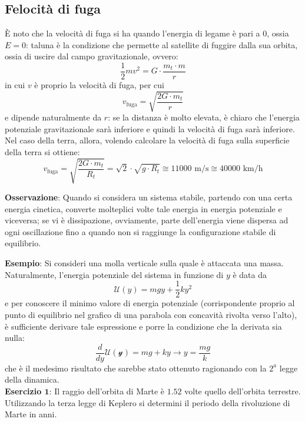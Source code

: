 \documentclass[a4paper]{extarticle}
\begin{document}
\vspace{1em}
\subsection{Felocità di fuga}
È noto che la velocità di fuga si ha quando l'energia di legame è pari a $0$, ossia $E=0$: taluna è la condizione che permette al satellite di fuggire dalla sua orbita, ossia di uscire dal campo gravitazionale, ovvero:
\[\frac{1}{2}m v^2 = G \cdot \frac{m_t \cdot m}{r}\]
in cui $v$ è proprio la velocità di fuga, per cui
\[\boxed{v_{\text{fuga}} = \sqrt{\frac{2G \cdot m_t}{r}}}\]
e dipende naturalmente da $r$: se la distanza è molto elevata, è chiaro che l'energia potenziale gravitazionale sarà inferiore e quindi la velocità di fuga sarà inferiore.\\
Nel caso della terra, allora, volendo calcolare la velocità di fuga sulla superficie della terra si ottiene:
\[v_{\text{fuga}} = \sqrt{\frac{2G \cdot m_t}{R_t}} = \sqrt{2} \cdot \sqrt{g \cdot R_t} \cong 11 000 \text{ m/s} \cong 40 000 \text{ km/h}\]

\vspace{1em}
\noindent
\textbf{Osservazione}: Quando si considera un sistema stabile, partendo con una certa energia cinetica, converte molteplici volte tale energia in energia potenziale e viceversa; se vi è dissipazione, ovviamente, parte dell'energia viene dispersa ad ogni oscillazione fino a quando non si raggiunge la configurazione stabile di equilibrio.

\vspace{1em}
\noindent
\textbf{Esempio}: Si consideri una molla verticale sulla quale è attaccata una massa. Naturalmente, l'energia potenziale del sistema in funzione di $y$ è data da
\[\mathcal{U}(y) = mg y + \frac{1}{2} k y^2\]
e per conoscere il minimo valore di energia potenziale (corrispondente proprio al punto di equilibrio nel grafico di una parabola con concavità rivolta verso l'alto), è sufficiente derivare tale espressione e porre la condizione che la derivata sia nulla:
\[\frac{d}{dy} \mathcal{U(y)} = mg + ky \longrightarrow y = \frac{mg}{k}\]
che è il medesimo risultato che sarebbe stato ottenuto ragionando con la $2^a$ legge della dinamica.\\

\vspace{1em}
\noindent
\textbf{Esercizio $\boldsymbol{1}$}: Il raggio dell'orbita di Marte è $1.52$ volte quello dell'orbita terrestre. Utilizzando la terza legge di Keplero si determini il periodo della rivoluzione di Marte in anni.
\end{document}
